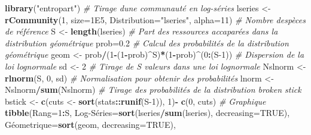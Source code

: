 \documentclass[
  11pt,
  french,
  a4paper,
  extrafontsizes,onecolumn,openright
  ]{memoir}
\newenvironment{Shaded}{\begin{snugshade}}{\end{snugshade}}
\newcommand{\AttributeTok}[1]{\textcolor[rgb]{0.13,0.29,0.53}{#1}}
\newcommand{\CommentTok}[1]{\textcolor[rgb]{0.56,0.35,0.01}{\textit{#1}}}
\newcommand{\ConstantTok}[1]{\textcolor[rgb]{0.56,0.35,0.01}{#1}}
\newcommand{\DecValTok}[1]{\textcolor[rgb]{0.00,0.00,0.81}{#1}}
\newcommand{\FloatTok}[1]{\textcolor[rgb]{0.00,0.00,0.81}{#1}}
\newcommand{\FunctionTok}[1]{\textcolor[rgb]{0.13,0.29,0.53}{\textbf{#1}}}
\newcommand{\NormalTok}[1]{#1}
\newcommand{\OtherTok}[1]{\textcolor[rgb]{0.56,0.35,0.01}{#1}}
\newcommand{\SpecialCharTok}[1]{\textcolor[rgb]{0.81,0.36,0.00}{\textbf{#1}}}
\newcommand{\StringTok}[1]{\textcolor[rgb]{0.31,0.60,0.02}{#1}}
\begin{document}
\begin{Shaded}
\begin{Highlighting}[]
\FunctionTok{library}\NormalTok{(}\StringTok{"entropart"}\NormalTok{)}
\CommentTok{\# Tirage d\textquotesingle{}une communauté en log{-}séries}
\NormalTok{lseries }\OtherTok{\textless{}{-}} \FunctionTok{rCommunity}\NormalTok{(}\DecValTok{1}\NormalTok{, }\AttributeTok{size=}\FloatTok{1E5}\NormalTok{, }\AttributeTok{Distribution=}\StringTok{"lseries"}\NormalTok{, }\AttributeTok{alpha=}\DecValTok{11}\NormalTok{)}
\CommentTok{\# Nombre d\textquotesingle{}espèces de référence}
\NormalTok{S }\OtherTok{\textless{}{-}} \FunctionTok{length}\NormalTok{(lseries)}
\CommentTok{\# Part des ressources accaparées dans la distribution géométrique}
\NormalTok{prob}\OtherTok{=}\FloatTok{0.2}
\CommentTok{\# Calcul des probabilités de la distribution géométrique}
\NormalTok{geom }\OtherTok{\textless{}{-}}\NormalTok{ prob}\SpecialCharTok{/}\NormalTok{(}\DecValTok{1}\SpecialCharTok{{-}}\NormalTok{(}\DecValTok{1}\SpecialCharTok{{-}}\NormalTok{prob)}\SpecialCharTok{\^{}}\NormalTok{S)}\SpecialCharTok{*}\NormalTok{(}\DecValTok{1}\SpecialCharTok{{-}}\NormalTok{prob)}\SpecialCharTok{\^{}}\NormalTok{(}\DecValTok{0}\SpecialCharTok{:}\NormalTok{(S}\DecValTok{{-}1}\NormalTok{))}
\CommentTok{\# Dispersion de la loi lognormale}
\NormalTok{sd }\OtherTok{\textless{}{-}} \DecValTok{2}
\CommentTok{\# Tirage de S valeurs dans une loi lognormale}
\NormalTok{Nslnorm }\OtherTok{\textless{}{-}} \FunctionTok{rlnorm}\NormalTok{(S, }\DecValTok{0}\NormalTok{, sd)}
\CommentTok{\# Normalisation pour obtenir des probabilités}
\NormalTok{lnorm }\OtherTok{\textless{}{-}}\NormalTok{ Nslnorm}\SpecialCharTok{/}\FunctionTok{sum}\NormalTok{(Nslnorm)}
\CommentTok{\# Tirage des probabilités de la distribution broken stick}
\NormalTok{bstick }\OtherTok{\textless{}{-}} \FunctionTok{c}\NormalTok{(cuts }\OtherTok{\textless{}{-}} \FunctionTok{sort}\NormalTok{(stats}\SpecialCharTok{::}\FunctionTok{runif}\NormalTok{(S}\DecValTok{{-}1}\NormalTok{)), }\DecValTok{1}\NormalTok{)}\SpecialCharTok{{-}} \FunctionTok{c}\NormalTok{(}\DecValTok{0}\NormalTok{, cuts)}
\CommentTok{\# Graphique}
\FunctionTok{tibble}\NormalTok{(}\AttributeTok{Rang=}\DecValTok{1}\SpecialCharTok{:}\NormalTok{S,}
      \StringTok{\textasciigrave{}}\AttributeTok{Log{-}Séries}\StringTok{\textasciigrave{}}\OtherTok{=}\FunctionTok{sort}\NormalTok{(lseries}\SpecialCharTok{/}\FunctionTok{sum}\NormalTok{(lseries), }\AttributeTok{decreasing=}\ConstantTok{TRUE}\NormalTok{),}
      \StringTok{\textasciigrave{}}\AttributeTok{Géometrique}\StringTok{\textasciigrave{}}\OtherTok{=}\FunctionTok{sort}\NormalTok{(geom, }\AttributeTok{decreasing=}\ConstantTok{TRUE}\NormalTok{),}

\end{Highlighting}
\end{Shaded}
\end{document}
